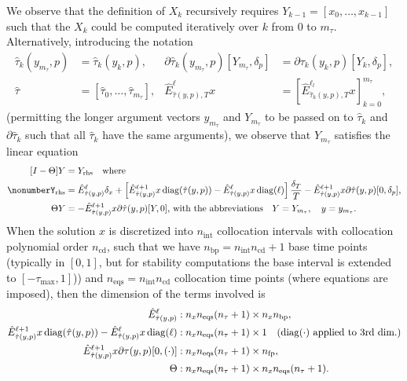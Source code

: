 \documentclass[11pt]{scrartcl}
\newcommand{\mt}[1]{\mathrm{#1}}
\newcommand{\nbp}{n_\mt{bp}}
\newcommand{\nint}{n_\mt{int}}
\newcommand{\neqs}{n_\mt{eqs}}
\newcommand{\nd}{n_\mt{cd}}
\DeclareMathOperator{\diag}{diag}
\begin{document}
We observe that the definition of $X_k$ recursively requires
$Y_{k-1}=[x_0,\ldots,x_{k-1}]$ such that the $X_k$ could be computed
iteratively over $k$ from $0$ to $m_\tau$. Alternatively, introducing the notation
\begin{align*}
  \hat{\tau}_k(y_{m_\tau},p)&=\hat{\tau}_k(y_k,p),&
  \partial\hat{\tau}_k(y_{m_\tau},p)[Y_{m_\tau},\delta_p]&=\partial\tau_k(y_k,p)[Y_k,\delta_p],\\
  \hat{\tau}&=[\hat{\tau}_0,\ldots,\hat{\tau}_{m_\tau}],&
  \hat{E}^\ell_{\hat{\tau}(y,p),T}x&=\left[\hat{E}^{\ell_l}_{\hat{\tau}_k(y,p),T}x\right]_{k=0}^{m_\tau},
\end{align*}
(permitting the longer argument vectors $y_{m_\tau}$ and $Y_{m_\tau}$
to be passed on to $\hat{\tau}_k$ and $\partial\hat{\tau}_k$ such that
all $\hat{\tau}_k$ have the same arguments), we observe that
$Y_{m_\tau}$ satisfies the linear equation
\begin{align}
  \label{eq:Yk:lin}
  [I-\Theta]Y&=Y_\mathrm{rhs}\mbox{\quad where}\\
  \nonumber%
  Y_\mathrm{rhs}&=\hat{E}^\ell_{\hat{\tau}(y,p)}\delta_x+\left[\hat{E}^{\ell+1}_{\hat{\tau}(y,p)}x\diag(\hat{\tau}(y,p))-\hat{E}^\ell_{\hat{\tau}(y,p)}x\diag(\ell)\right]\frac{\delta_T}{T}-\hat{E}^{\ell+1}_{\hat{\tau}(y,p)}x\partial\hat{\tau}(y,p)[0,\delta_p]\mbox{,}\\
  \nonumber%
  \Theta Y&=-\hat{E}^{\ell+1}_{\hat{\tau}(y,p)}x\partial\hat{\tau}(y,p)[Y,0]\mbox{,\ with the abbreviations\quad}
  Y=Y_{m_\tau},\quad y=y_{m_\tau}.
\end{align}
When the solution $x$ is discretized into $\nint$ collocation
intervals with collocation polynomial order $\nd$, such that we have
$\nbp=\nint\nd+1$ base time points (typically in $[0,1]$, but for
stability computations the base interval is extended to
$[-\tau_{\max},1]$)) and $\neqs=\nint\nd$ collocation time points (where equations are imposed), then the dimension of the terms involved is
\begin{align*}
  \hat{E}^\ell_{\hat{\tau}(y,p)}&:n_x\neqs (n_\tau+1)\times n_x\nbp,\\
  \hat{E}^{\ell+1}_{\hat{\tau}(y,p)}x\diag(\hat{\tau}(y,p))-\hat{E}^\ell_{\hat{\tau}(y,p)}x\diag(\ell)&:n_x\neqs(n_\tau+1)\times1\mbox{\quad ($\diag(\cdot)$ applied to $3$rd dim.)}\\
  \hat{E}^{\ell+1}_{\hat{\tau}(y,p)}x\partial\tau(y,p)[0,(\cdot)]&:n_x\neqs(n_\tau+1)\times n_\mathrm{fp},\\
  \Theta&:n_x\neqs(n_\tau+1)\times n_x\neqs(n_\tau+1).
\end{align*}
\end{document}
